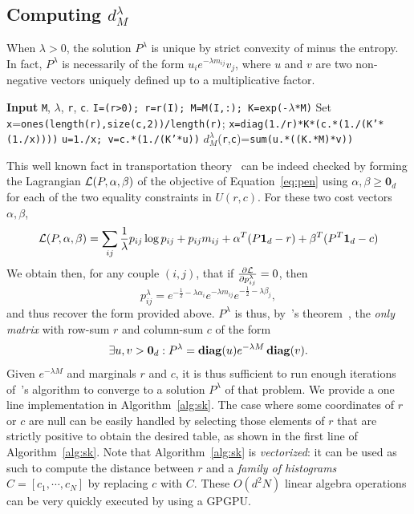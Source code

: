 \documentclass{amsart} %
\begin{document}
\subsection{Computing $d_{M}^\lambda$} When $\lambda>0$, the solution $P^\lambda$ is unique by strict convexity of minus the entropy. In fact, $P^\lambda$ is necessarily of the form $u_i e^{-\lambda m_{ij}} v_j$, where $u$ and $v$ are two non-negative vectors uniquely defined up to a multiplicative factor. 
\begin{algorithm}[H]
        \begin{algorithmic}
	\caption{Computation of $d^\lambda_M(r,c)$ using Sinkhorn-Knopp's fixed point iteration}\label{alg:sk}
          \STATE \textbf{Input} \texttt{M}, $\lambda$, \texttt{r}, \texttt{c}.
		  \STATE \texttt{I=(r>0); r=r(I); M=M(I,:); \texttt{K=exp(-$\lambda$*M)}}
		  \STATE Set \texttt{x}=\texttt{ones(length(r),size(c,2))/length(r)};
		  \STATE \texttt{x=diag(1./r)*K*(c.*(1./(K'*(1./x))))}
		  \ENDWHILE
		  \STATE  \texttt{u=1./x;  v=c.*(1./(K'*u))}
		  \STATE $d_{M}^\lambda$(\texttt{r},\texttt{c})=\texttt{sum(u.*((K.*M)*v))}
        \end{algorithmic}
      \end{algorithm}    	
This well known fact in transportation theory~\citep{erlander1990gravity} can be indeed checked by forming the Lagrangian $\mathcal{L}(P,\alpha,\beta)$ of the objective of Equation~\eqref{eq:pen} using $\alpha,\beta\geq \mathbf{0}_d$ for each of the two equality constraints in $U(r,c)$. For these two cost vectors $\alpha,\beta$,
$$\mathcal{L}(P,\alpha,\beta)=\sum_{ij} \frac{1}{\lambda}p_{ij}\log p_{ij}+ p_{ij}m_{ij} + \alpha^T(P \mathbf 1_d-r) + \beta^T(P^T\mathbf 1_d-c)$$
We obtain then, for any couple $(i,j)$, that if $\frac{\partial \mathcal{L}}{\partial p_{ij}^\lambda}=0$, then 
$$
p_{ij}^\lambda= e^{-\frac{1}{2}-\lambda \alpha_i} e^{-\lambda m_{ij}}e^{-\frac{1}{2}-\lambda \beta_j},
$$
and thus recover the form provided above. $P^\lambda$ is thus, by~\citeauthor{sinkhorn1967concerning}'s theorem~\citeyearpar{sinkhorn1967concerning}, the \emph{only matrix} with row-sum $r$ and column-sum $c$ of the form
\begin{equation}\label{eq:sinkhorn}\exists u,v>\mathbf{0}_d : P^\lambda = \mathop{\bf diag}(u) e^{-\lambda M} \mathop{\bf diag}(v).\end{equation}
Given $e^{-\lambda M}$ and marginals $r$ and $c$, it is thus sufficient to run enough iterations of~\citeauthor{sinkhorn1967concerning}'s algorithm to converge to a solution $P^\lambda$ of that problem. We provide a one line implementation in Algorithm~\ref{alg:sk}. The case where some coordinates of $r$ or $c$ are null can be easily handled by selecting those elements of $r$ that are strictly positive to obtain the desired table, as shown in the first line of Algorithm~\ref{alg:sk}. Note that Algorithm~\ref{alg:sk} is \emph{vectorized}: it can be used as such to compute the distance between $r$ and a \emph{family of histograms} $C=[c_1,\cdots,c_N]$ by replacing $c$ with $C$. These $O(d^2N)$ linear algebra operations can be very quickly executed by using a GPGPU. 
\end{document}
